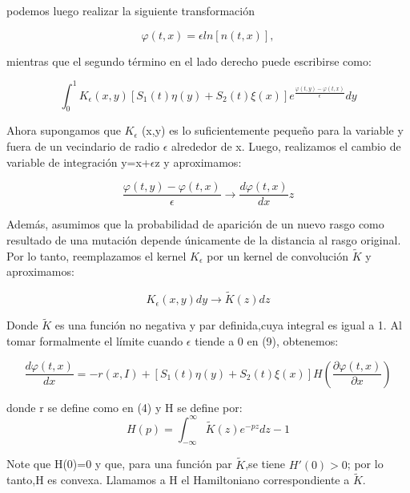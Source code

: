 podemos luego realizar la siguiente transformación

\begin{equation}
	\varphi(t,x)=\epsilon ln[n(t,x)],
\end{equation}

mientras que el segundo término en el lado derecho puede escribirse como:

\begin{equation}
	\int_{0}^{1}K_{\epsilon}(x,y)[S_1(t)\eta(y)+S_2(t)\xi(x)]e^{\frac{\varphi(t,y)-\varphi(t,x)}{\epsilon}}dy
\end{equation}

Ahora supongamos que $K_{\epsilon}$ (x,y) es lo suficientemente pequeño para la variable y fuera de un vecindario de radio $\epsilon$ alrededor de x. Luego, realizamos el cambio de variable de integración y=x+$\epsilon$z y aproximamos:

\begin{equation}
	\frac{\varphi(t,y)-\varphi(t,x)}{\epsilon} \to \frac{d\varphi(t,x) }{dx}z
\end{equation}

Además, asumimos que la probabilidad de aparición de un nuevo rasgo como resultado de una mutación depende únicamente de la distancia al rasgo original. Por lo tanto, reemplazamos el kernel $K_{\epsilon}$ por un kernel de convolución $\widetilde{K}$ y aproximamos:

\begin{equation}
	K_{\epsilon}(x,y)dy\longrightarrow \widetilde{K}(z)dz
\end{equation}

Donde $\widetilde{K}$ es una función no negativa y par definida,cuya integral es igual a 1. Al tomar formalmente el límite cuando $\epsilon$ tiende a 0 en (9), obtenemos:

\begin{equation}
	\frac{d\varphi(t,x) }{dx}=-r(x,I)+[S_1(t)\eta(y)+S_2(t)\xi(x)]H(\frac{\partial \varphi(t,x) }{\partial x})
\end{equation}


donde r se define como en (4) y H se define por:
\begin{equation}
	H(p)=\int_{-\infty}^{\infty}\widetilde{K}(z)e^{-pz}dz-1
\end{equation}

Note que H(0)=0 y que, para una función par $\widetilde{K}$,se tiene $H'(0)>0$; por lo tanto,H es convexa. Llamamos a H el Hamiltoniano correspondiente a $\widetilde{K}$.


